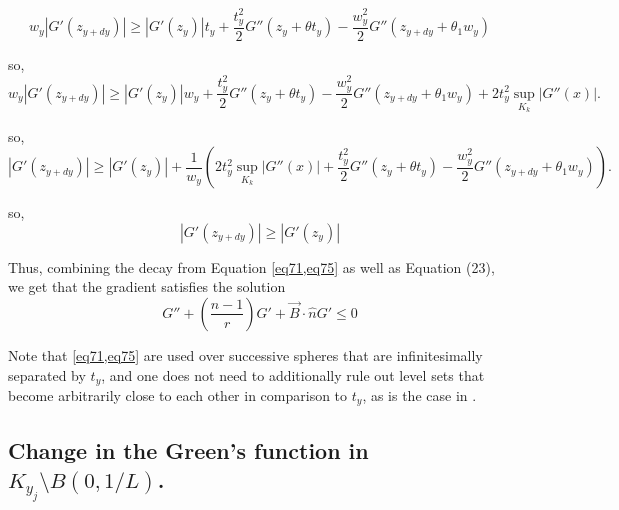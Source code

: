 \documentclass{article}
\theoremstyle{plain}
\theoremstyle{definition}
\theoremstyle{plain}
\begin{document}
\begin{itemize}
\begin{equation}
w_y |G'(z_{y+dy})| \ge |G'(z_y)| t_y + \frac{t_y^2}{2} G''(z_y + \theta t_y) - \frac{w_y^2}{2} G''(z_{y+dy} + \theta_1 w_y)
\end{equation}

so, \begin{equation}w_y |G'(z_{y+dy})| \ge |G'(z_y)| w_y + \frac{t_y^2}{2} G''(z_y + \theta t_y) - \frac{w_y^2}{2} G''(z_{y+dy} + \theta_1 w_y) + 2 t_y^2 \sup_{K_k} |G''(x)|.\end{equation}

so, \begin{equation}|G'(z_{y+dy})| \ge |G'(z_y)| + \frac{1}{w_y} \left( 2 t_y^2 \sup_{K_k} |G''(x)| + \frac{t_y^2}{2} G''(z_y + \theta t_y) - \frac{w_y^2}{2} G''(z_{y+dy} + \theta_1 w_y) \right).\end{equation}

so, \begin{equation} \label{eq75}
|G'(z_{y+dy})| \ge |G'(z_y)|
\end{equation}
\end{itemize}
Thus, combining the decay from Equation \cref{eq71,eq75} as well as Equation (23), we get that the gradient satisfies the solution
\begin{equation}
G'' + \left( \frac{n-1}{r} \right) G' + \vec{B} \cdot \hat{n} G' \le 0
\end{equation}

Note that \cref{eq71,eq75} are used over successive spheres that are infinitesimally separated by $t_y$, and one does not need to additionally rule out level sets that become arbitrarily close to each other in comparison to $t_y$, as is the case in \cite{Pat25}.


\subsection{Change in the Green's function in $K_{y_j}\setminus B(0,1/L)$.}
\end{document}
